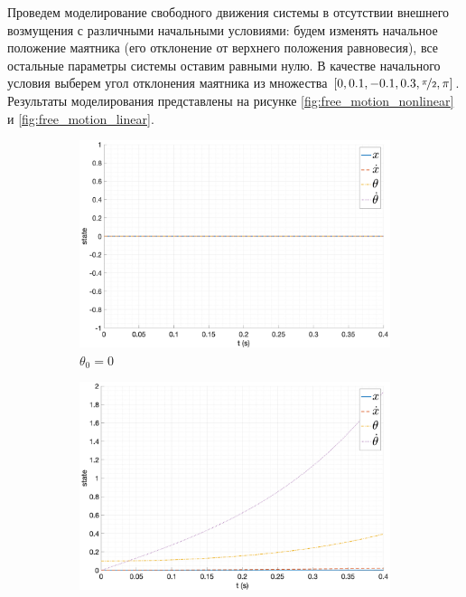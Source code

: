 Проведем моделирование свободного движения системы в отсутствии внешнего 
возмущения с различными начальными условиями: будем изменять 
начальное положение маятника (его отклонение от верхнего положения равновесия), все остальные параметры 
системы оставим равными нулю. В качестве начального условия выберем угол отклонения маятника из множества 
$[0, 0.1, -0.1, 0.3, \nicefrac{\pi}{2}, \pi]$. Результаты моделирования представлены на
рисунке \ref{fig:free_motion_nonlinear} и \ref{fig:free_motion_linear}.
\begin{figure}[ht!]
    \centering
    \begin{subfigure}[b]{0.45\textwidth}
        \includegraphics[width=\textwidth]{media/plots/free_motion/state_1.png}
        \caption{$\theta_0 = 0$}
  \end{subfigure}
    \begin{subfigure}[b]{0.45\textwidth}
        \includegraphics[width=\textwidth]{media/plots/free_motion/state_2.png}

\end{subfigure}
\end{figure}

